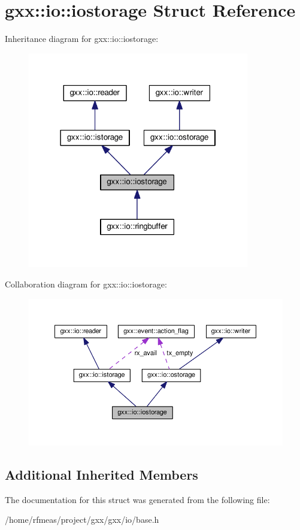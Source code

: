 \hypertarget{structgxx_1_1io_1_1iostorage}{}\section{gxx\+:\+:io\+:\+:iostorage Struct Reference}
\label{structgxx_1_1io_1_1iostorage}


Inheritance diagram for gxx\+:\+:io\+:\+:iostorage\+:
\nopagebreak
\begin{figure}[H]
\begin{center}
\leavevmode
\includegraphics[width=274pt]{structgxx_1_1io_1_1iostorage__inherit__graph}
\end{center}
\end{figure}


Collaboration diagram for gxx\+:\+:io\+:\+:iostorage\+:
\nopagebreak
\begin{figure}[H]
\begin{center}
\leavevmode
\includegraphics[width=350pt]{structgxx_1_1io_1_1iostorage__coll__graph}
\end{center}
\end{figure}
\subsection*{Additional Inherited Members}


The documentation for this struct was generated from the following file\+:\begin{DoxyCompactItemize}
\item 
/home/rfmeas/project/gxx/gxx/io/base.\+h\end{DoxyCompactItemize}
